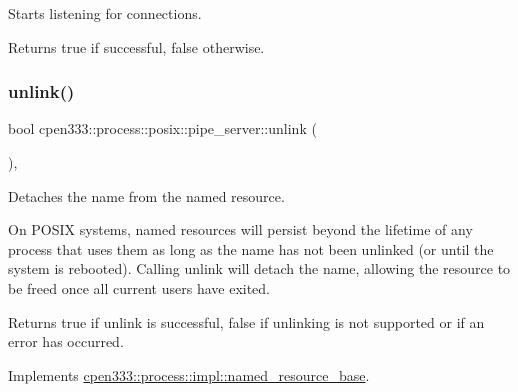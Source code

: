 Starts listening for connections. 

\begin{DoxyReturn}{Returns}
true if successful, false otherwise. 
\end{DoxyReturn}
\mbox{\label{classcpen333_1_1process_1_1posix_1_1pipe__server_a5c4da1864cb0db53e76d960230f3a83a}} 
\subsubsection{\texorpdfstring{unlink()}{unlink()}\hspace{0.1cm}{\footnotesize\ttfamily [1/2]}}
{\footnotesize\ttfamily bool cpen333\+::process\+::posix\+::pipe\+\_\+server\+::unlink (\begin{DoxyParamCaption}{ }\end{DoxyParamCaption})\hspace{0.3cm}{\ttfamily [inline]}, {\ttfamily [virtual]}}



Detaches the name from the named resource. 

On P\+O\+S\+IX systems, named resources will persist beyond the lifetime of any process that uses them as long as the name has not been unlinked (or until the system is rebooted). Calling {\ttfamily unlink} will detach the name, allowing the resource to be freed once all current users have exited.

\begin{DoxyReturn}{Returns}
{\ttfamily true} if unlink is successful, {\ttfamily false} if unlinking is not supported or if an error has occurred. 
\end{DoxyReturn}


Implements \hyperlink{classcpen333_1_1process_1_1impl_1_1named__resource__base_ae4033f82dfd068b917a9bca57d3a0c45}{cpen333\+::process\+::impl\+::named\+\_\+resource\+\_\+base}.

\mbox{\label{classcpen333_1_1process_1_1posix_1_1pipe__server_a7962624ab13060295c1f0b1f0d871e13}} 
